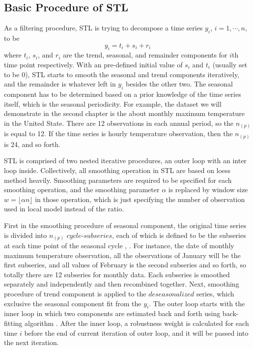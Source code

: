 \subsection{Basic Procedure of STL}

As a filtering procedure, STL is trying to decompose a time series 
$y_i$, $i=1, \cdots, n$, to be
\begin{equation} 
\label{stlModel}
y_i = t_i + s_i + r_i
\end{equation}
where $t_i$, $s_i$, and $r_i$ are the trend, seasonal, and remainder components
for $i$th time point respectively. With an pre-defined initial value of $s_i$ and 
$t_i$ (usually set to be 0), STL starts to smooth the seasonal and trend components 
iteratively, and the remainder is whatever left in $y_i$ besides the other two. 
The seasonal component has to be determined based on a prior knowledge of the time
series itself, which is the seasonal periodicity. For example, the dataset we will
demonstrate in the second chapter is the about monthly maximum temperature in the
United State. There are 12 observations in each annual period, so the $n_{(p)}$ 
is equal to 12. If the time series is hourly temperature observation, then the
$n_{(p)}$ is 24, and so forth.

STL is comprised of two nested iterative procedures, an outer loop with an inter 
loop inside. Collectively, all smoothing operation in STL are based on loess method
heavily. Smoothing parameters are required to be specified for each smoothing 
operation, and the smoothing parameter $\alpha$ is replaced by window size
$w=\lfloor \alpha n\rfloor$ in those operation, which is just specifying the 
number of observation used in local model instead of the ratio.  

First in the smoothing procedure of seasonal component, the original time series 
is divided into $n_{(p)}$ $cycle$-$subseries$, each of which is defined to be 
the subseries at each time point of the seasonal cycle \cite{hafen2010local}, 
\cite{Cleveland:1990}. For instance, the date of monthly maximum temperature 
observation, all the observations of January will be the first subseries, and
all values of February is the second subseries and so forth, so totally there are 
12 subseries for monthly data. Each subseries is smoothed separately and 
independently and then recombined together. Next, smoothing procedure of 
trend component is applied to the $deseasonalized$ series, which exclusive the 
seasonal component fit from the $y_i$. The outer loop starts with the inner loop
in which two components are estimated back and forth using back-fitting algorithm 
\cite{breiman1985estimating}. After the inner loop, a robustness weight is 
calculated for each time $i$ before the end of current iteration of outer loop,
and it will be passed into the next iteration.

